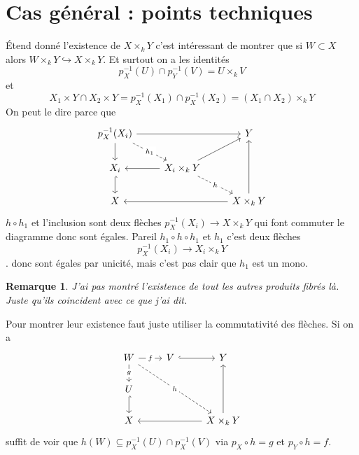 \documentclass[a4paper,12pt]{book}
\theoremstyle{plain}
\newtheorem{rem}{Remarque}
\theoremstyle{definition}
\theoremstyle{remark}
\begin{document}
\section{Cas général : points techniques}
Étend donné l'existence de $X\times_k Y$ c'est intéressant de 
montrer que si $W\subset X$ alors 
$W\times_k Y\hookrightarrow X\times_kY$. Et surtout on a les identités
\[p_X^{-1}(U)\cap p_Y^{-1}(V)=U\times_k V\]
et 
\[X_1\times Y\cap X_2\times Y=p_X^{-1}(X_1)\cap p_X^{-1}(X_2)=
(X_1\cap X_2)\times_k Y\]
On peut le dire parce que 
\[\begin{tikzcd}
	{p_X^{-1}(X_i)} && Y \\
	{X_i} & {X_i\times_k Y} \\
	X && {X\times_kY}
	\arrow[from=1-1, to=1-3]
	\arrow[from=1-1, to=2-1]
	\arrow["{h_1}"{description}, dashed, from=1-1, to=2-2]
	\arrow[hook, from=2-1, to=3-1]
	\arrow[from=2-2, to=1-3]
	\arrow[from=2-2, to=2-1]
	\arrow["h"{description}, dashed, from=2-2, to=3-3]
	\arrow[from=3-3, to=1-3]
	\arrow[from=3-3, to=3-1]
\end{tikzcd}\]
$h\circ h_1$ et l'inclusion sont deux flèches
$p_X^{-1}(X_i)\to X\times_kY$ qui font commuter le diagramme donc sont
égales. Pareil $h_1\circ h\circ h_1$  et $h_1$ c'est deux flèches 
\[p_X^{-1}(X_i) \to X_i\times_kY\].
donc sont égales par unicité, mais c'est pas clair que $h_1$ est un mono.

\begin{rem}
    J'ai pas montré l'existence de tout les autres produits fibrés là.
    Juste qu'ils coincident avec ce que j'ai dit.
\end{rem}
Pour montrer leur existence faut juste utiliser la commutativité des
flèches. Si on a 
\[\begin{tikzcd}
	W & V & Y \\
	U \\
	X && {X\times_k Y}
	\arrow["f"{description}, from=1-1, to=1-2]
	\arrow["g"{description}, from=1-1, to=2-1]
	\arrow["h"{description}, dashed, from=1-1, to=3-3]
	\arrow[hook, from=1-2, to=1-3]
	\arrow[hook, from=2-1, to=3-1]
	\arrow[from=3-3, to=1-3]
	\arrow[from=3-3, to=3-1]
\end{tikzcd}\]
suffit de voir que $h(W)\subseteq p_X^{-1}(U)\cap p_X^{-1}(V)$ via
$p_X\circ h=g$ et $p_Y\circ h=f$.
\end{document}
